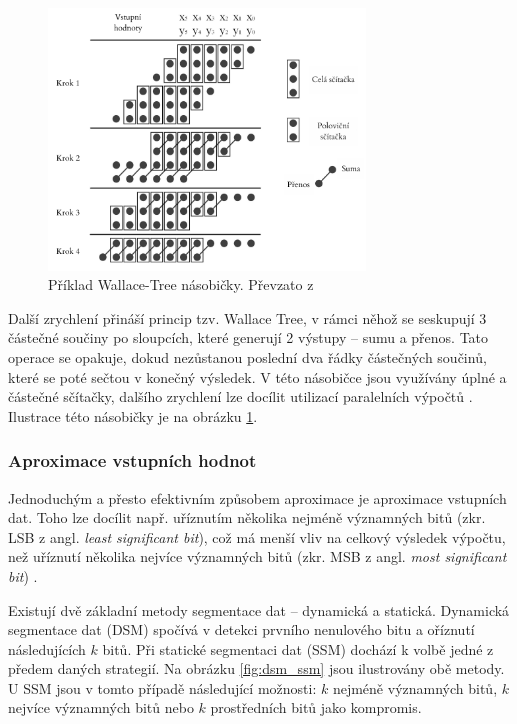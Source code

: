 \begin{figure}[H]
    \centering
    \includegraphics[width=0.75\textwidth]{obrazky-figures/wallacetree.png}
    \caption{Příklad Wallace-Tree násobičky. Převzato z \cite{approx_mult_survey}}
    \label{fig:wallacetree}
\end{figure}

Další zrychlení přináší princip tzv. Wallace Tree, v rámci něhož se seskupují 3 částečné součiny po sloupcích, které generují 2 výstupy -- sumu a přenos. Tato operace se opakuje, dokud nezůstanou poslední dva řádky částečných součinů, které se poté sečtou v konečný výsledek. V této násobičce jsou využívány úplné a částečné sčítačky, dalšího zrychlení lze docílit utilizací paralelních výpočtů \cite{wallace_tree}. Ilustrace této násobičky je na obrázku \ref{fig:wallacetree}.

\subsubsection{Aproximace vstupních hodnot}
Jednoduchým a přesto efektivním způsobem aproximace je aproximace vstupních dat. Toho lze docílit např. uříznutím několika nejméně významných bitů (zkr. LSB z angl. \textit{least significant bit}), což má menší vliv na celkový výsledek výpočtu, než uříznutí několika nejvíce významných bitů (zkr. MSB z angl. \textit{most significant bit}) \cite{approx_mult_survey}. 

Existují dvě základní metody segmentace dat -- dynamická a statická. Dynamická segmentace dat (DSM) spočívá v detekci prvního nenulového bitu a oříznutí následujících $k$ bitů. Při statické segmentaci dat (SSM) dochází k volbě jedné z předem daných strategií. Na obrázku \ref{fig:dsm_ssm} jsou ilustrovány obě metody. U SSM jsou v tomto případě následující možnosti: $k$ nejméně významných bitů, $k$ nejvíce významných bitů nebo $k$ prostředních bitů jako kompromis.

